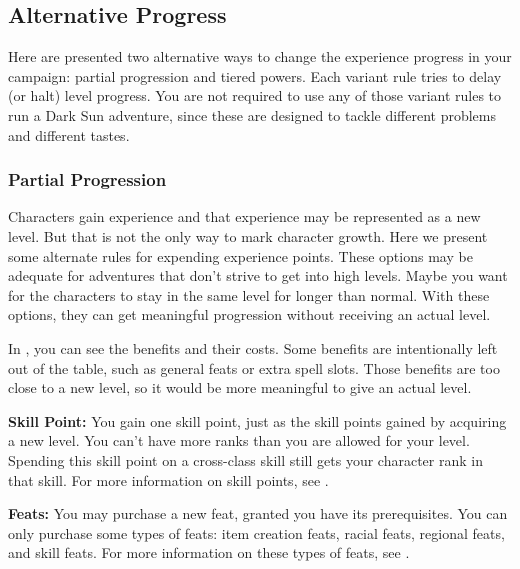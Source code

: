 \subsection{Alternative Progress}
Here are presented two alternative ways to change the experience progress in your campaign: partial progression and tiered powers. Each variant rule tries to delay (or halt) level progress. You are not required to use any of those variant rules to run a {\tableheader Dark Sun} adventure, since these are designed to tackle different problems and different tastes.

\subsubsection{Partial Progression}
Characters gain experience and that experience may be represented as a new level. But that is not the only way to mark character growth. Here we present some alternate rules for expending experience points. These options may be adequate for adventures that don't strive to get into high levels. Maybe you want for the characters to stay in the same level for longer than normal. With these options, they can get meaningful progression without receiving an actual level.

In , you can see the benefits and their costs. Some benefits are intentionally left out of the table, such as general feats or extra spell slots. Those benefits are too close to a new level, so it would be more meaningful to give an actual level.


\textbf{Skill Point:} You gain one skill point, just as the skill points gained by acquiring a new level. You can't have more ranks than you are allowed for your level. Spending this skill point on a cross-class skill still gets your character \onehalf rank in that skill. For more information on skill points, see .

\textbf{Feats:} You may purchase a new feat, granted you have its prerequisites. You can only purchase some types of feats: item creation feats, racial feats, regional feats, and skill feats. For more information on these types of feats, see .

